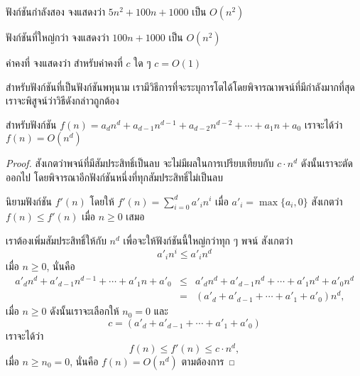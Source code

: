 \begin{quiz}{ฟังก์ชัน{\wbr}กำลัง{\wbr}สอง}
จง{\wbr}แสดง{\wbr}ว่า $5n^2 + 100n + 1000$ เป็น $O(n^2)$
\end{quiz}

\begin{quiz}{ฟังก์ชัน{\wbr}ที่{\wbr}ใหญ่{\wbr}กว่า}
จง{\wbr}แสดง{\wbr}ว่า $100n + 1000$ เป็น $O(n^2)$
\end{quiz}

\begin{quiz}{ค่าคงที่}
จง{\wbr}แสดง{\wbr}ว่า สำหรับ{\wbr}ค่าคงที่ $c$ ใด ๆ $c = O(1)$
\end{quiz}

สำหรับ{\wbr}ฟังก์ชัน{\wbr}ที่{\wbr}เป็น{\wbr}ฟังก์ชัน{\wbr}พหุ{\wbr}นาม{\wbr}
เรา{\wbr}มี{\wbr}วิธีการ{\wbr}ที่{\wbr}จะ{\wbr}ระบุ{\wbr}การ{\wbr}โต{\wbr}ได้{\wbr}โดย{\wbr}พิจารณา{\wbr}พจน์{\wbr}ที่{\wbr}มี{\wbr}กำลัง{\wbr}มาก{\wbr}ที่สุด เรา{\wbr}จะ{\wbr}พิสูจน์{\wbr}ว่า{\wbr}วิธี{\wbr}ดังกล่าว{\wbr}ถูกต้อง{\wbr}

\begin{theorem}
สำหรับ{\wbr}ฟังก์ชัน $f(n)=a_dn^d + a_{d-1}n^{d-1} + a_{d-2}n^{d-2} +\cdots +
a_1n + a_0$ เรา{\wbr}จะ{\wbr}ได้{\wbr}ว่า $f(n)=O(n^d)$
\end{theorem}
\begin{proof}
สังเกต{\wbr}ว่า{\wbr}พจน์{\wbr}ที่{\wbr}มี{\wbr}สัมประสิทธิ์{\wbr}เป็น{\wbr}ลบ จะ{\wbr}ไม่{\wbr}มี{\wbr}ผล{\wbr}ใน{\wbr}การ{\wbr}เปรียบเทียบ{\wbr}กับ $c\cdot n^d$
ดังนั้น{\wbr}เรา{\wbr}จะ{\wbr}ตัด{\wbr}ออก{\wbr}ไป โดย{\wbr}พิจารณา{\wbr}อีก{\wbr}ฟังก์ชัน{\wbr}หนึ่ง{\wbr}ที่{\wbr}ทุก{\wbr}สัมประสิทธิ์{\wbr}ไม่{\wbr}เป็น{\wbr}ลบ{\wbr}

นิยาม{\wbr}ฟังก์ชัน $f'(n)$ โดย{\wbr}ให้ $f'(n)=\sum_{i=0}^{d} a'_i n^i$ เมื่อ{\wbr}
$a'_i=\max\{a_i,0\}$ สังเกต{\wbr}ว่า $f(n)\leq f'(n)$ เมื่อ $n \geq 0$ เสมอ{\wbr}

เรา{\wbr}ต้อง{\wbr}เพิ่ม{\wbr}สัมประสิทธิ์{\wbr}ให้{\wbr}กับ $n^d$ เพื่อ{\wbr}จะ{\wbr}ให้{\wbr}ฟังก์ชัน{\wbr}นี้{\wbr}ใหญ่{\wbr}กว่า{\wbr}ทุก ๆ พจน์ สังเกต{\wbr}ว่า{\wbr}
\[
a'_i n^i \leq a'_i n^d
\]
เมื่อ $n\geq 0$, นั่น{\wbr}คือ{\wbr}
\begin{eqnarray*}
a'_d n^d + a'_{d-1}n^{d-1} +\cdots + a'_1n + a'_0 
&\leq&
a'_d n^d + a'_{d-1}n^d +\cdots + a'_1n^d + a'_0n^d\\
&=&
\left(a'_d + a'_{d-1} +\cdots + a'_1 + a'_0\right)n^d,
\end{eqnarray*}
เมื่อ $n\geq 0$ ดังนั้น{\wbr}เรา{\wbr}จะ{\wbr}เลือก{\wbr}ให้ $n_0=0$ และ{\wbr}
\[
c = \left(a'_d + a'_{d-1} +\cdots + a'_1 + a'_0\right)
\]
เรา{\wbr}จะ{\wbr}ได้{\wbr}ว่า{\wbr}
\[
f(n) \leq f'(n) \leq c\cdot n^d,
\]
เมื่อ $n\geq n_0=0$, นั่น{\wbr}คือ $f(n)=O(n^d)$ ตาม{\wbr}ต้องการ{\wbr}
\end{proof}

